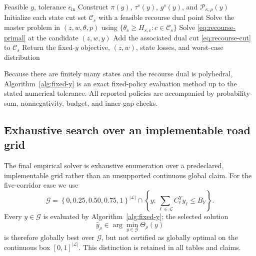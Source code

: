 \begin{algorithm}[t]
\caption{Fixed-road oracle for \(\Theta_\rho(y)\)}
\label{alg:fixed-y}
\begin{algorithmic}[1]
\Require Feasible \(y\), tolerance \(\epsilon_{\mathrm{in}}\)
\State Construct \(\pi(y)\), \(\tau^s(y)\), \(g^s(y)\), and
       \(\mathcal P_{\kappa,\rho}(y)\)
\State Initialize each state cut set \(\mathcal C_s\) with a feasible
       recourse dual point
\Repeat
  \State Solve the master problem in \((z,w,\theta,p)\) using
         \(\{\theta_s\geq H_{s,c}:c\in\mathcal C_s\}\)
    \State Solve \eqref{eq:recourse-primal} at the candidate \((z,w,y)\)
      \State Add the associated dual cut \eqref{eq:recourse-cut} to
             \(\mathcal C_s\)
    \EndIf
  \EndFor
{}
\State Return the fixed-\(y\) objective, \((z,w)\), state losses, and
       worst-case distribution
\end{algorithmic}
\end{algorithm}

Because there are finitely many states and the recourse dual is polyhedral,
Algorithm~\ref{alg:fixed-y} is an exact fixed-policy evaluation method up
to the stated numerical tolerance. All reported policies are accompanied by
probability-sum, nonnegativity, budget, and inner-gap checks.

\subsection{Exhaustive search over an implementable road grid}
\label{sec:grid-search}

The final empirical solver is exhaustive enumeration over a predeclared,
implementable grid rather than an unsupported continuous global claim. For
the five-corridor case we use
\begin{equation}
 \mathcal G
 =
 \left\{0,0.25,0.50,0.75,1\right\}^{\lvert\mathcal L\rvert}
 \cap
 \left\{y:\sum_{\ell\in\mathcal L}C_\ell^Yy_\ell\leq B_Y\right\}.
\label{eq:road-grid}
\end{equation}
Every \(y\in\mathcal G\) is evaluated by Algorithm~\ref{alg:fixed-y}; the
selected solution
\begin{equation}
  \widehat y_\rho\in\arg\min_{y\in\mathcal G}\Theta_\rho(y)
\label{eq:grid-policy}
\end{equation}
is therefore globally best over \(\mathcal G\), but not certified as
globally optimal on the continuous box \([0,1]^{\lvert\mathcal L\rvert}\).
This distinction is retained in all tables and claims.


